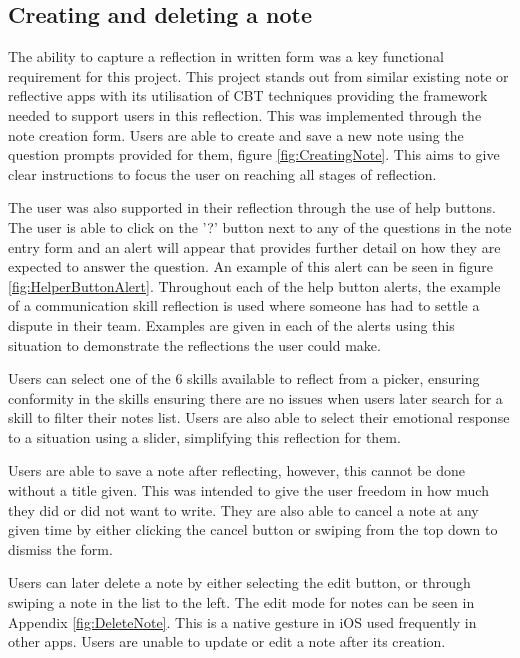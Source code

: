 \documentclass{l4proj}
\begin{document}
\subsection{Creating and deleting a note}

The ability to capture a reflection in written form was a key functional requirement for this project. This project stands out from similar existing note or reflective apps with its utilisation of CBT techniques providing the framework needed to support users in this reflection. This was implemented through the note creation form. Users are able to create and save a new note using the question prompts provided for them, figure \ref{fig:CreatingNote}. This aims to give clear instructions to focus the user on reaching all stages of reflection. 

The user was also supported in their reflection through the use of help buttons. The user is able to click on the '?' button next to any of the questions in the note entry form and an alert will appear that provides further detail on how they are expected to answer the question. An example of this alert can be seen in figure \ref{fig:HelperButtonAlert}. Throughout each of the help button alerts, the example of a communication skill reflection is used where someone has had to settle a dispute in their team. Examples are given in each of the alerts using this situation to demonstrate the reflections the user could make.

Users can select one of the 6 skills available to reflect from a picker, ensuring conformity in the skills ensuring there are no issues when users later search for a skill to filter their notes list. Users are also able to select their emotional response to a situation using a slider, simplifying this reflection for them. 

Users are able to save a note after reflecting, however, this cannot be done without a title given. This was intended to give the user freedom in how much they did or did not want to write. They are also able to cancel a note at any given time by either clicking the cancel button or swiping from the top down to dismiss the form. 

Users can later delete a note by either selecting the edit button, or through swiping a note in the list to the left. The edit mode for notes can be seen in Appendix \ref{fig:DeleteNote}. This is a native gesture in iOS used frequently in other apps. Users are unable to update or edit a note after its creation. 
\end{document}
